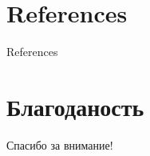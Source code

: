 \section{References}

\begin{frame}[t]{References}
	\printbibliography
	\url{}
\end{frame}

\section{Благоданость}
\begin{frame}
	\centering
	\huge
	Спасибо за внимание!
\end{frame}



